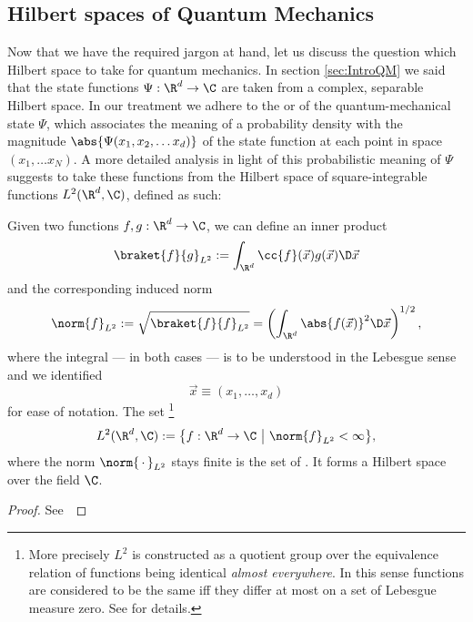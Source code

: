 \subsection{Hilbert spaces of Quantum Mechanics}

Now that we have the required jargon at hand,
let us discuss the question which Hilbert space to take for quantum mechanics.
In section \ref{sec:IntroQM} we said that the state functions
$\Psi : \R^d \to \C$ are taken from a complex, separable Hilbert space.
In our treatment we adhere to the
 or 
of the quantum-mechanical state $\Psi$,
which associates the meaning of a probability density
with the magnitude $\abs{\Psi(x_1, x_2, \ldots x_d)}$
of the state function at each point in space $(x_1, \ldots x_N)$.
A more detailed analysis in light of this probabilistic meaning of $\Psi$
suggests to take these functions from the Hilbert space of square-integrable functions
$L^2(\R^d, \C)$, defined as such:

\begin{prop}
	\label{prop:L2HilbertSpace}
	Given two functions $f, g : \R^d \to \C$,
	we can define an inner product
	\begin{equation}
		\braket{f}{g}_{L^2} := \int_{\R^d} \cc{f}(\vec{x}) g(\vec{x}) \D \vec{x}
		\label{eqn:defL2InnProd}
	\end{equation}
	and the corresponding induced norm
	\begin{equation}
		\norm{f}_{L^2} := \sqrt{\braket{f}{f}_{L^2}} = \left( \int_{\R^d} \abs{f(\vec{x})}^2 \D \vec{x} \right)^{1/2},
		\label{eqn:defL2Norm}
	\end{equation}
	where the integral --- in both cases --- is to be understood in the Lebesgue sense
	and we identified
	\[ \vec{x} \equiv (x_1, \ldots, x_d) \]
	for ease of notation. The set%
	\footnote{More precisely $L^2$ is constructed as a quotient group
		over the equivalence relation of functions being identical
		\textit{almost everywhere}. In this sense functions are considered
		to be the same iff they differ at most on a set of Lebesgue measure zero.
		See \cite{DiracNotation} for details.}
	\[ L^2(\R^d, \C) := \big\{ f : \R^d \to \C ~\big|~ \norm{f}_{L^2} < \infty \big\}, \]
	where the norm $\norm{\slot}_{L^2}$ stays finite
	is the set of .
	It forms a Hilbert space over the field $\C$.
	\begin{proof}
		See~\cite{Adams2003}
	\end{proof}
\end{prop}

